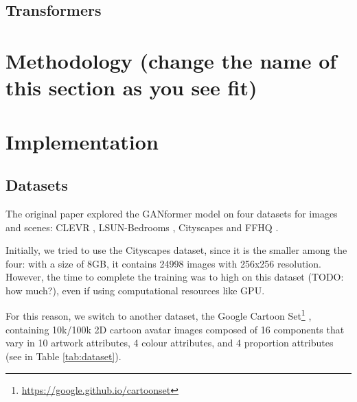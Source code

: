 \documentclass{article}
\begin{document}
	\subsection{Transformers}
	
	\section{Methodology (change the name of this section as you see fit)}
	
	
	\section{Implementation}
%	
%	
%	
%	
	\subsection{Datasets}
	
	The original paper \cite{hudson2021generative} explored the GANformer model on four datasets for 
	images and scenes: CLEVR \cite{johnson2017clevr}, LSUN-Bedrooms \cite{yu2015lsun}, Cityscapes 
	\cite{cordts2016cityscapes} and FFHQ \cite{karras2019style}. 
	
	Initially, we tried to use the Cityscapes dataset, since it is the smaller among the four: with a size of 
	8GB, it contains 24998 images with 256x256 resolution. 
	However, the time to complete the training was to high on this dataset (TODO: how much?), even if 
	using computational resources like GPU.
	
	For this reason, we switch to another dataset, the Google Cartoon Set\footnote{	
	\url{https://google.github.io/cartoonset}} \cite{cartoonset}, containing 10k/100k 2D cartoon avatar 
	images composed of 16 components that vary in 10 artwork attributes, 4 colour attributes, and 4 
	proportion attributes (see in Table \ref{tab:dataset}). 
\end{document}
